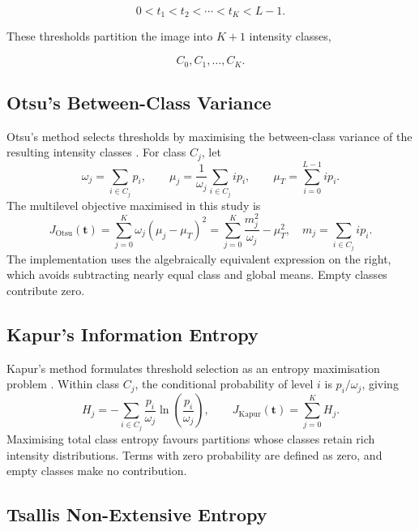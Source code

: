 \documentclass[review]{elsarticle}
\begin{document}
\begin{equation}
0 < t_1 < t_2 < \cdots < t_K < L-1.
\end{equation}

These thresholds partition the image into $K+1$ intensity classes,

\begin{equation}
C_0,C_1,\ldots,C_K.
\end{equation}


\subsection{Otsu's Between-Class Variance}
\label{sec:otsu}

Otsu's method selects thresholds by maximising the between-class
variance of the resulting intensity classes \citep{otsu1979threshold}.
For class $C_j$, let
\begin{equation}
\omega_j=\sum_{i\in C_j}p_i,
\qquad
\mu_j=\frac{1}{\omega_j}\sum_{i\in C_j}i p_i,
\qquad
\mu_T=\sum_{i=0}^{L-1}i p_i.
\end{equation}
The multilevel objective maximised in this study is
\begin{equation}
J_{\mathrm{Otsu}}(\mathbf{t})
=\sum_{j=0}^{K}\omega_j(\mu_j-\mu_T)^2
=\sum_{j=0}^{K}\frac{m_j^2}{\omega_j}-\mu_T^2,
\quad m_j=\sum_{i\in C_j}i p_i.
\end{equation}
The implementation uses the algebraically equivalent expression on the
right, which avoids subtracting nearly equal class and global means. Empty
classes contribute zero.


\subsection{Kapur's Information Entropy}
\label{sec:kapur}

Kapur's method formulates threshold selection as an entropy maximisation
problem \citep{kapur1985entropy}. Within class $C_j$, the conditional
probability of level $i$ is $p_i/\omega_j$, giving
\begin{equation}
H_j=-\sum_{i\in C_j}\frac{p_i}{\omega_j}
\ln\left(\frac{p_i}{\omega_j}\right),
\qquad
J_{\mathrm{Kapur}}(\mathbf{t})=\sum_{j=0}^{K}H_j.
\end{equation}
Maximising total class entropy favours partitions whose classes retain rich
intensity distributions. Terms with zero probability are defined as zero,
and empty classes make no contribution.


\subsection{Tsallis Non-Extensive Entropy}
\label{sec:tsallis}
\end{document}
